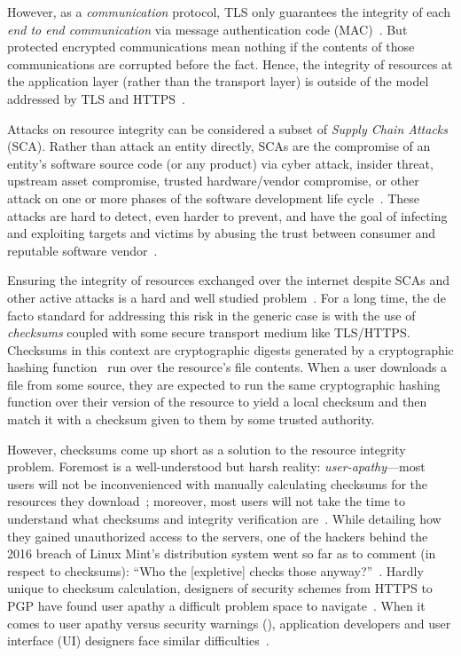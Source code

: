 However, as a \textit{communication} protocol, TLS only guarantees the integrity
of each \textit{end to end communication} via message authentication code
(MAC)~\cite{TLS1.2}. But protected encrypted communications mean nothing if the
contents of those communications are corrupted before the fact. Hence, the
integrity of resources at the application layer (rather than the transport
layer) is outside of the model addressed by TLS and HTTPS~\cite{TLS1.2, HTTPS}.

Attacks on resource integrity can be considered a subset of \emph{Supply Chain
Attacks} (SCA). Rather than attack an entity directly, SCAs are the compromise
of an entity's software source code (or any product) via cyber attack, insider
threat, upstream asset compromise, trusted hardware/vendor compromise, or other
attack on one or more phases of the software development life
cycle~\cite{NIST-SCA}. These attacks are hard to detect, even harder to prevent,
and have the goal of infecting and exploiting targets and victims by abusing the
trust between consumer and reputable software vendor~\cite{SCA}.

Ensuring the integrity of resources exchanged over the internet despite SCAs and
other active attacks is a hard and well studied problem~\cite{MD5Header,
HTTP1.1, HTTPS, SRI, LF, OpenPGP1, DNSSEC, PKI, Cherubini, Stickler}. For a long
time, the de facto standard for addressing this risk in the generic case is with
the use of \textit{checksums} coupled with some secure transport medium like
TLS/HTTPS. Checksums in this context are cryptographic digests generated by a
cryptographic hashing function~\cite{Rogaway} run over the resource's file
contents. When a user downloads a file from some source, they are expected to
run the same cryptographic hashing function over their version of the resource
to yield a local checksum and then match it with a checksum given to them by
some trusted authority.

However, checksums come up short as a solution to the resource integrity
problem. Foremost is a well-understood but harsh reality:
\emph{user-apathy}---most users will not be inconvenienced with manually
calculating checksums for the resources they download~\cite{Cherubini, Fagan};
moreover, most users will not take the time to understand what checksums and
integrity verification are~\cite{Cherubini, Tan, Hsiao}. While detailing how
they gained unauthorized access to the servers, one of the hackers behind the
2016 breach of Linux Mint's distribution system went so far as to comment (in
respect to checksums): ``Who the [expletive] checks those
anyway?''~\cite{SCA-MINT3}. Hardly unique to checksum calculation, designers of
security schemes from HTTPS to PGP have found user apathy a difficult problem
space to navigate~\cite{PGPBad, Cherubini}. When it comes to user apathy versus
security warnings (), application developers and user
interface (UI) designers face similar difficulties~\cite{Clickthrough, Egelman1,
Egelman2, Jenkins, Modic, Reeder, Silic, Sunshine, Bianchi, Akhawe}.

